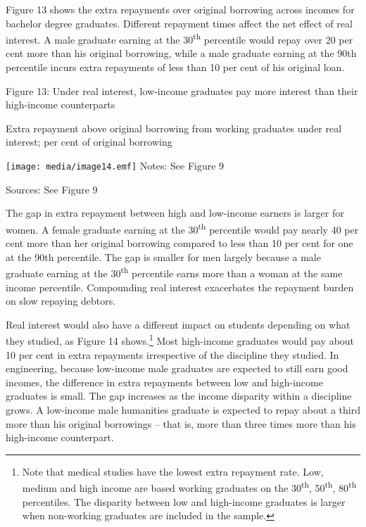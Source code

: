 \documentclass[]{book}
\begin{document}
Figure 13 shows the extra repayments over original borrowing across incomes for bachelor degree graduates. Different repayment times affect the net effect of real interest. A male graduate earning at the 30\textsuperscript{th} percentile would repay over 20 per cent more than his original borrowing, while a male graduate earning at the 90th percentile incurs extra repayments of less than 10 per cent of his original loan.

\protect\hypertarget{_Ref323477984}{}{}Figure 13: Under real interest, low-income graduates pay more interest than their high-income counterparts

Extra repayment above original borrowing from working graduates under real interest; per cent of original borrowing

\texttt{[image: media/image14.emf]} Notes: See Figure 9

Sources: See Figure 9

The gap in extra repayment between high and low-income earners is larger for women. A female graduate earning at the 30\textsuperscript{th} percentile would pay nearly 40 per cent more than her original borrowing compared to less than 10 per cent for one at the 90th percentile. The gap is smaller for men largely because a male graduate earning at the 30\textsuperscript{th} percentile earns more than a woman at the same income percentile. Compounding real interest exacerbates the repayment burden on slow repaying debtors.

Real interest would also have a different impact on students depending on what they studied, as Figure 14 shows.\footnote{Note that medical studies have the lowest extra repayment rate. Low, medium and high income are based working graduates on the 30\textsuperscript{th}, 50\textsuperscript{th}, 80\textsuperscript{th} percentiles. The disparity between low and high-income graduates is larger when non-working graduates are included in the sample.} Most high-income graduates would pay about 10 per cent in extra repayments irrespective of the discipline they studied. In engineering, because low-income male graduates are expected to still earn good incomes, the difference in extra repayments between low and high-income graduates is small. The gap increases as the income disparity within a discipline grows. A low-income male humanities graduate is expected to repay about a third more than his original borrowings -- that is, more than three times more than his high-income counterpart.
\end{document}
